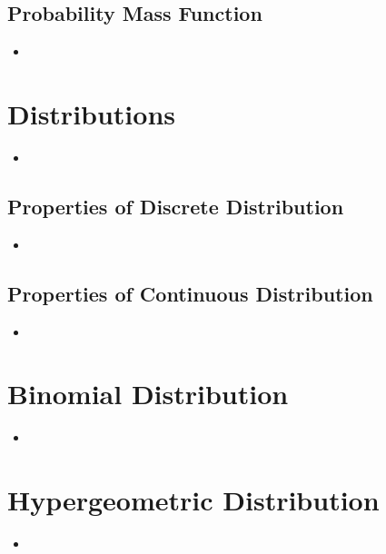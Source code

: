\documentclass[8pt]{report}
\begin{document}
		\subsection{Probability Mass Function}
			\begin{itemize}
				\item
			\end{itemize}\hrulefill
	\section{Distributions}
		\begin{itemize}
				\item
		\end{itemize}\hrulefill
		\subsection{Properties of Discrete Distribution}
			\begin{itemize}
				\item
			\end{itemize}\hrulefill
		\subsection{Properties of Continuous Distribution}
			\begin{itemize}
				\item
			\end{itemize}\hrulefill
	\section{Binomial Distribution}
		\begin{itemize}
				\item
			\end{itemize}\hrulefill
	\section{Hypergeometric Distribution}
		\begin{itemize}
				\item
			\end{itemize}\hrulefill
\end{document}
